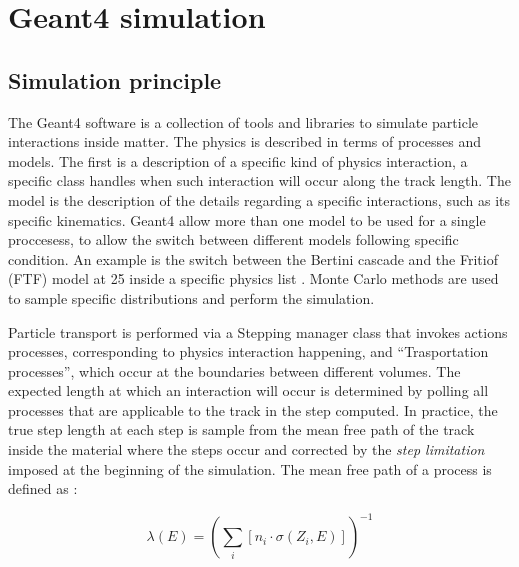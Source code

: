 
\newcommand{\appdirc}{appendices/plots/appendixC}

\chapter{Geant4 simulation} %

\label{AppendixC} %

\section{Simulation principle}
\label{appC:sec:simulation-principle}

The Geant4 software is a collection of tools and libraries to simulate particle interactions inside matter. The physics is described in terms of processes and models. The first is a description of a specific kind of physics interaction, a specific class handles when such interaction will occur along the track length. The model is the description of the details regarding a specific interactions, such as its specific kinematics. Geant4 allow more than one model to be used for a single proccesess, to allow the switch between different models following specific condition. An example is the switch between the Bertini cascade \cite{Heikkinen:2003sc} and the Fritiof (FTF) model at 25 \gev inside a specific physics list \cite{Uzhinsky:2013hea}. Monte Carlo methods are used to sample specific distributions and perform the simulation.

Particle transport is performed via a Stepping manager class that invokes actions processes, corresponding to physics interaction happening, and ``Trasportation processes'', which occur at the boundaries between different volumes. The expected length at which an interaction will occur is determined by polling all processes that are applicable to the track in the step computed. In practice, the true step length at each step is sample from the mean free path of the track inside the material where the steps occur and corrected by the \textit{step limitation} imposed at the beginning of the simulation. The mean free path of a process is defined as \cite{AGOSTINELLI2003250}:

\begin{equation}
  \label{eq:mfp-g4}
  \lambda(E) = \left( \sum_i [ n_i \cdot \sigma(Z_i,E)] \right)^{-1}
\end{equation}

